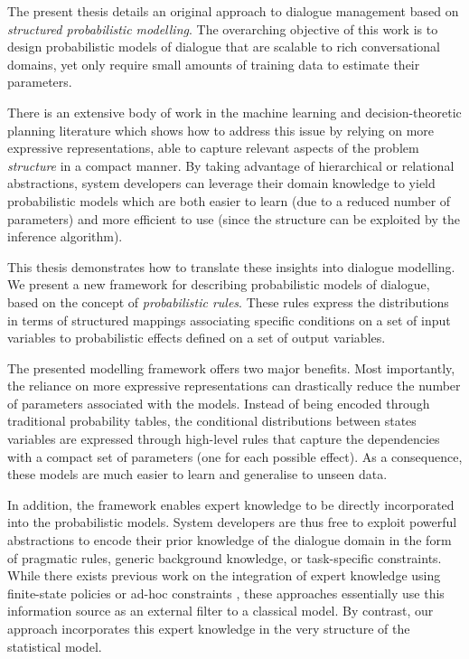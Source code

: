 The present thesis details an original approach to dialogue management based on \textit{structured probabilistic modelling}.  The overarching objective of this work is to design probabilistic models of dialogue that are scalable to rich conversational domains, yet only require small amounts of training data to estimate their parameters.

There is an extensive body of work in the machine learning and decision-theoretic planning literature which shows how to address this issue by relying on more expressive representations, able to capture relevant aspects of the problem \textit{structure} in a compact manner. By taking advantage of hierarchical or relational abstractions, system developers can leverage their domain knowledge to yield probabilistic models which are both easier to learn (due to a reduced number of parameters) and more efficient to use (since the structure can be exploited by the inference algorithm).

This thesis demonstrates how to translate these insights into dialogue modelling. We present a new framework for describing probabilistic models of dialogue, based on the concept of \textit{probabilistic rules}.  These rules express the distributions in terms of structured mappings associating specific conditions on a set of input variables to probabilistic effects defined on a set of output variables. 

The presented modelling framework offers two major benefits. Most importantly, the reliance on more expressive representations can drastically reduce the number of parameters associated with the models.  Instead of being encoded through traditional probability tables, the conditional distributions between states variables are expressed through high-level rules that capture the dependencies with a compact set of parameters (one for each possible effect). As a consequence, these models are much easier to learn and generalise to unseen data. 

In addition, the framework enables expert knowledge to be directly incorporated into the probabilistic models. System developers are thus free to exploit powerful abstractions to encode their prior knowledge of the dialogue domain in the form of pragmatic rules, generic background knowledge, or task-specific constraints.  While there exists previous work on the integration of expert knowledge using finite-state policies or ad-hoc constraints \citep{heeman2007,williams2008}, these approaches essentially use this information source as an external filter to a classical model.  By contrast, our approach incorporates this expert knowledge in the very structure of the statistical model.

